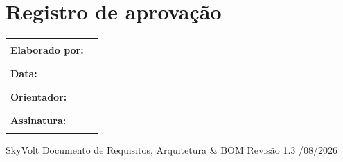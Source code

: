 \documentclass[11pt,a4paper]{article}
\begin{document}
\section*{Registro de aprovação}

\begin{longtable}{@{}p{4.2cm}p{4.2cm}@{}}
\textbf{Elaborado por:} & \rule{4cm}{0.4pt} \\[1.4em]
\textbf{Data:} & \rule{4cm}{0.4pt} \\[1.4em]
\textbf{Orientador:} & \rule{4cm}{0.4pt} \\[1.4em]
\textbf{Assinatura:} & \rule{4cm}{0.4pt} \\
\end{longtable}

\vfill
\begin{center}
{\footnotesize\ttfamily\color{voltgray} SkyVolt \;\textbullet\; Documento de Requisitos, Arquitetura \& BOM \;\textbullet\; Revisão 1.3 \;\textbullet{}/08/2026}
\end{center}
\end{document}
